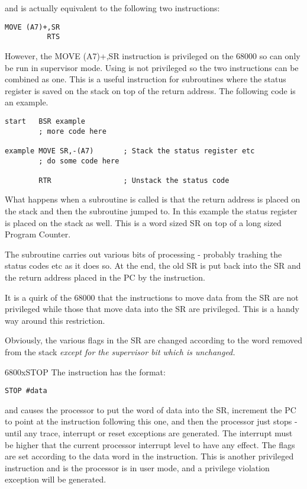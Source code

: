 and is actually equivalent to the following two instructions:

\begin{lstlisting}[firstnumber=1,]
          MOVE (A7)+,SR
          RTS
\end{lstlisting}

However, the MOVE (A7)+,SR instruction is privileged on the 68000
      so can only be run in supervisor mode. Using  is not privileged so
      the two instructions can be combined as one. This is a useful
      instruction for subroutines where the status register is saved on the
      stack on top of the return address. The following code is an
      example.

\begin{lstlisting}[firstnumber=1,caption={RTR Example},label={lst:RtrExample}]
start   BSR example
        ; more code here

example MOVE SR,-(A7)       ; Stack the status register etc
        ; do some code here

        RTR                 ; Unstack the status code
\end{lstlisting}

What happens when a subroutine is called is that the return
      address is placed on the stack and then the subroutine jumped to. In
      this example the status register is placed on the stack as well. This is
      a word sized SR on top of a long sized Program Counter.

The subroutine carries out various bits of processing -{} probably
      trashing the status codes etc as it does so. At the end, the old SR is
      put back into the SR and the return address placed in the PC by the 
      instruction.

It is a quirk of the 68000 that the instructions to move data from
      the SR are not privileged while those that move data into the SR are
      privileged. This is a handy way around this restriction.

Obviously, the various flags in the SR are changed according to
      the word removed from the stack \emph{except for the supervisor bit
      which is unchanged.}

\mc6800x{STOP}
The  instruction has the format:

\begin{lstlisting}[firstnumber=1,]
          STOP #data
\end{lstlisting}

and causes the processor to put the word of data into the SR,
      increment the PC to point at the instruction following this one, and
      then the processor just stops -{} until any trace, interrupt or reset
      exceptions are generated. The interrupt must be higher that the current
      processor interrupt level to have any effect. The flags are set
      according to the data word in the instruction. This is another
      privileged instruction and is the processor is in user mode, and a
      privilege violation exception will be generated.

